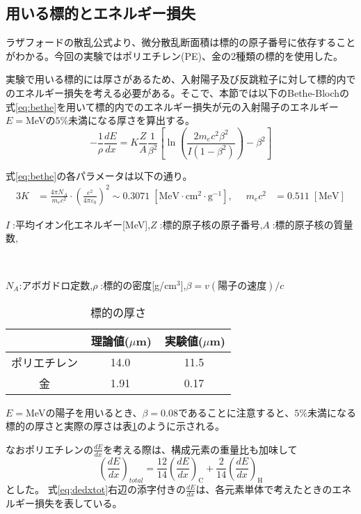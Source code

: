 \documentclass[a4paper,11pt,dvipdfmx]{jsarticle}
\begin{document}
\renewcommand\thefootnote{\arabic{footnote})}
\subsection{用いる標的とエネルギー損失}
\label{tarandloss}
ラザフォードの散乱公式より、微分散乱断面積は標的の原子番号に依存することがわかる。今回の実験ではポリエチレン(PE)、金の2種類の標的を使用した。

実験で用いる標的には厚さがあるため、入射陽子及び反跳粒子に対して標的内でのエネルギー損失を考える必要がある。そこで、本節では以下のBethe-Blochの式\eqref{eq:bethe}\cite{introto}を用いて標的内でのエネルギー損失が元の入射陽子のエネルギー$E=$\;MeV\;の$5\%$未満になる厚さを算出する。
\begin{equation}
    -\frac{1}{\rho}\frac{dE}{dx}=K\frac{Z}{A}\frac{1}{\beta^2}\left[\ln\left(\frac{2m_{e}c^2\beta^2}{I\left(1-\beta^2\right)}\right)-\beta^2\right]\label{eq:bethe}
\end{equation}

式\eqref{eq:bethe}の各パラメータは以下の通り。
\begin{alignat*}{3}
    K &= \frac{4\pi N_{A}}{m_{e}c^2}\cdot\left(\frac{e^2}{4\pi\varepsilon_{0}}\right)^{2} \sim0.3071\;[\text{MeV}\cdot\text{cm}^2\cdot\text{g}^{-1}], & \;\; m_{e}c^2 &= 0.511\;[\text{MeV}]
\end{alignat*}
\centerline{$I\;$:平均イオン化エネルギー[MeV],\;\;$Z\;$:標的原子核の原子番号,\;\;$A\;$:標的原子核の質量数,}\\
\centerline{$N_{A}$:アボガドロ定数,\;\;$\rho\;$:標的の密度[g/{cm}$^3$],\;\;$\beta=v(陽子の速度)/c$ }




\begin{table}[htbp]
 \centering
  \begin{tabular}{ccc}
   \hline 
   \  & \,理論値($\mu$m)  & \;\,実験値($\mu$m)  \\
   \hline \hline
   ポリエチレン & 14.0 & 11.5  \\
   金 & 1.91 & 0.17  \\
   \hline    
  \end{tabular}
  \caption{標的の厚さ}
   \label{table:loss}
\end{table}

$E=$\;MeV\;の陽子を用いるとき、$\beta=0.08$であることに注意すると、$5\%$未満になる標的の厚さと実際の厚さは表\ref{table:loss}のように示される。

なおポリエチレンの$\tfrac{dE}{dx}$を考える際は、構成元素の重量比も加味して\cite{eneloss}
\begin{equation}
    \left(\frac{dE}{dx}\right)_{total}=\frac{12}{14}\left(\frac{dE}{dx}\right)_\text{C} + \frac{2}{14}\left(\frac{dE}{dx}\right)_\text{H}
    \label{eq:dedxtot}
\end{equation}
とした。
式\eqref{eq:dedxtot}右辺の添字付きの$\tfrac{dE}{dx}$は、各元素単体で考えたときのエネルギー損失を表している。
\end{document}
